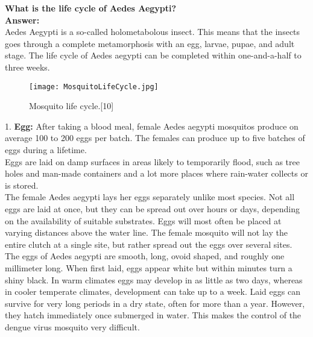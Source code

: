 \documentclass[11pt]{exam}
\begin{document}
\begin{questions}
\question
\label{6. Life cycle of Ae.aegypti}
\textbf{What is the life cycle of Aedes Aegypti?}\\
\textbf{Answer:} \\
Aedes Aegypti is a so-called holometabolous insect. This means that the insects goes through a complete metamorphosis with an egg, larvae, pupae, and adult stage. The life cycle of Aedes aegypti can be completed within one-and-a-half to three weeks. \\
\begin{figure}[H]
  \centering
  \texttt{[image: MosquitoLifeCycle.jpg]}\label{fig:f1}
  \caption{Mosquito life cycle.[10]}
\end{figure} 
1. \textbf{Egg:} After taking a blood meal, female Aedes aegypti mosquitos produce on average 100 to 200 eggs per batch. The females can produce up to five batches of eggs during a lifetime. \\ %
Eggs are laid on damp surfaces in areas likely to temporarily flood, such as tree holes and man-made containers and a lot more places where rain-water collects or is stored.\\%
The female Aedes aegypti lays her eggs separately unlike most species. Not all eggs are laid at once, but they can be spread out over hours or days, depending on the availability of suitable substrates. Eggs will most often be placed at varying distances above the water line. The female mosquito will not lay the entire clutch at a single site, but rather spread out the eggs over several sites.\\
The eggs of Aedes aegypti are smooth, long, ovoid shaped, and roughly one millimeter long. When first laid, eggs appear white but within minutes turn a shiny black. In warm climates eggs may develop in as little as two days, whereas in cooler temperate climates, development can take up to a week. Laid eggs can survive for very long periods in a dry state, often for more than a year. However, they hatch immediately once submerged in water. This makes the control of the dengue virus mosquito very difficult.\\ 


\end{questions}
\end{document}
